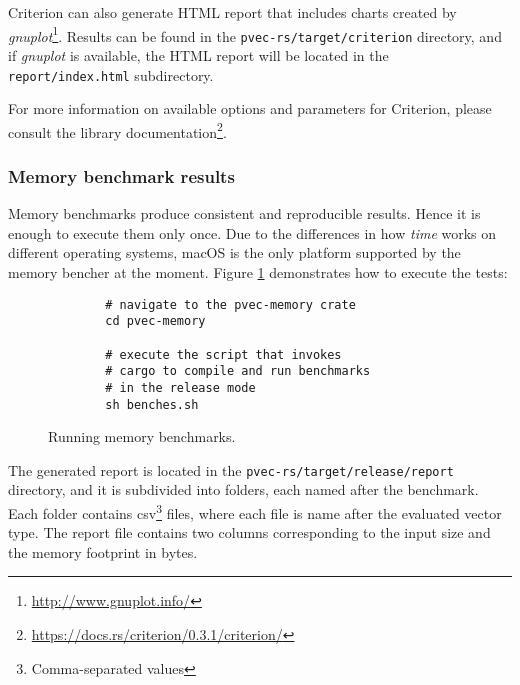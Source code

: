 Criterion can also generate HTML report that includes charts created by \emph{gnuplot}\footnote{\url{http://www.gnuplot.info/}}. Results can be found in the \texttt{pvec-rs/target/criterion} directory, and if \emph{gnuplot} is available, the HTML report will be located in the \texttt{report/index.html} subdirectory.

For more information on available options and parameters for Criterion, please consult the library documentation\footnote{\url{https://docs.rs/criterion/0.3.1/criterion/}}.

\subsubsection*{Memory benchmark results}
Memory benchmarks produce consistent and reproducible results. Hence it is enough to execute them only once. Due to the differences in how \emph{time} works on different operating systems, macOS is the only platform supported by the memory bencher at the moment. Figure \ref{fig:memory-benches} demonstrates how to execute the tests:

\begin{figure}[!htbp]
    \centering

    \begin{verbatim}
        # navigate to the pvec-memory crate
        cd pvec-memory

        # execute the script that invokes
        # cargo to compile and run benchmarks
        # in the release mode
        sh benches.sh
    \end{verbatim}

    \caption{Running memory benchmarks.}
    \label{fig:memory-benches}
\end{figure}

The generated report is located in the \texttt{pvec-rs/target/release/report} directory, and it is subdivided into folders, each named after the benchmark. Each folder contains csv\footnote{Comma-separated values} files, where each file is name after the evaluated vector type. The report file contains two columns corresponding to the input size and the memory footprint in bytes.
